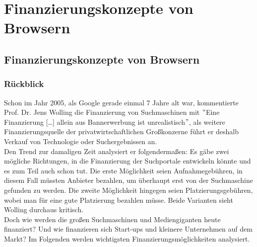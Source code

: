 \chapter{Finanzierungskonzepte von Browsern}\label{ch:finanzierungskonzepte-von-browsern}


\section{Finanzierungskonzepte von Browsern}\label{sec:finanzierungskonzepte-von-browsern}

\subsection{Rückblick}\label{subsec:rueckblick}
Schon im Jahr 2005, als Google gerade einmal 7 Jahre alt war,
kommentierte Prof. Dr. Jens Wolling die Finanzierung von Suchmaschinen mit
\("\)Eine Finanzierung [\ldots] allein aus Bannerwerbung ist unrealistisch\("\)\cite{WOL05},
als weitere Finanzierungsquelle der privatwirtschaftlichen Großkonzerne führt er deshalb Verkauf von Technologie oder
Suchergebnissen an.\cite{WOL05}\\

Den Trend zur damaligen Zeit analysiert er folgendermaßen: Es gäbe zwei mögliche Richtungen, in die Finanzierung der Suchportale entwickeln könnte und es zum Teil auch schon tut.
Die erste Möglichkeit seien Aufnahmegebühren, in diesem Fall müssten Anbieter bezahlen, um überhaupt erst von der Suchmaschine gefunden zu werden.
Die zweite Möglichkeit hingegen seien Platzierungsgebühren, wobei man für eine gute Platzierung bezahlen müsse.
Beide Varianten sieht Wolling durchaus kritisch.\cite{WOL05}\\

Doch wie werden die großen Suchmaschinen und Mediengiganten heute finanziert?
Und wie finanzieren sich Start-ups und kleinere Unternehmen auf dem Markt?
Im Folgenden werden wichtigsten Finanzierungsmöglichkeiten analysiert.

